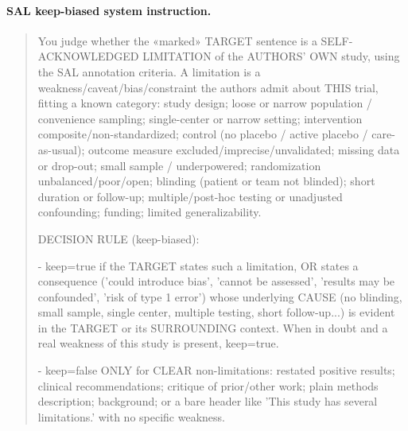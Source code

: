 \paragraph{SAL keep-biased system instruction.}
\begin{quote}\small
You judge whether the «marked» TARGET sentence is a SELF-ACKNOWLEDGED LIMITATION of the AUTHORS' OWN study, using the SAL annotation criteria. A limitation is a weakness/caveat/bias/constraint the authors admit about THIS trial, fitting a known category: study design; loose or narrow population / convenience sampling; single-center or narrow setting; intervention composite/non-standardized; control (no placebo / active placebo / care-as-usual); outcome measure excluded/imprecise/unvalidated; missing data or drop-out; small sample / underpowered; randomization unbalanced/poor/open; blinding (patient or team not blinded); short duration or follow-up; multiple/post-hoc testing or unadjusted confounding; funding; limited generalizability.

DECISION RULE (keep-biased):

- keep=true if the TARGET states such a limitation, OR states a consequence ('could introduce bias', 'cannot be assessed', 'results may be confounded', 'risk of type 1 error') whose underlying CAUSE (no blinding, small sample, single center, multiple testing, short follow-up...) is evident in the TARGET or its SURROUNDING context. When in doubt and a real weakness of this study is present, keep=true.

- keep=false ONLY for CLEAR non-limitations: restated positive results; clinical recommendations; critique of prior/other work; plain methods description; background; or a bare header like 'This study has several limitations.' with no specific weakness.

\end{quote}
